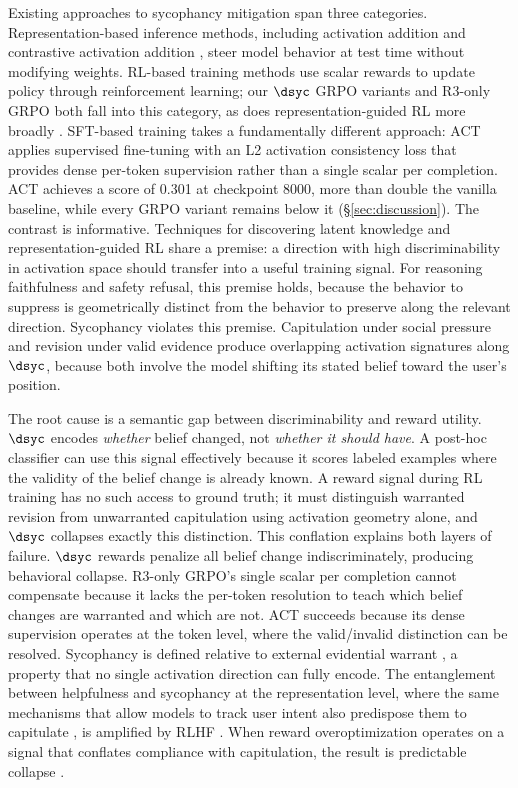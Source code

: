Existing approaches to sycophancy mitigation span three categories.
Representation-based inference methods, including activation addition \citep{turner2023actadd} and contrastive activation addition \citep{rimsky2024caa}, steer model behavior at test time without modifying weights.
RL-based training methods use scalar rewards to update policy through reinforcement learning; our $\dsyc$ GRPO variants and R3-only GRPO both fall into this category, as does representation-guided RL more broadly \citep{zhang2026latentgrpo}.
SFT-based training takes a fundamentally different approach: ACT \citep{consistency2025bctact} applies supervised fine-tuning with an L2 activation consistency loss that provides dense per-token supervision rather than a single scalar per completion.
ACT achieves a \sycon{} score of 0.301 at checkpoint 8000, more than double the vanilla baseline, while every GRPO variant remains below it (\S\ref{sec:discussion}).
The contrast is informative.
Techniques for discovering latent knowledge \citep{burns2023ccs} and representation-guided RL share a premise: a direction with high discriminability in activation space should transfer into a useful training signal.
For reasoning faithfulness and safety refusal, this premise holds, because the behavior to suppress is geometrically distinct from the behavior to preserve along the relevant direction.
Sycophancy violates this premise.
Capitulation under social pressure and revision under valid evidence produce overlapping activation signatures along $\dsyc$, because both involve the model shifting its stated belief toward the user's position.

The root cause is a semantic gap between discriminability and reward utility.
$\dsyc$ encodes \emph{whether} belief changed, not \emph{whether it should have}.
A post-hoc classifier can use this signal effectively because it scores labeled examples where the validity of the belief change is already known.
A reward signal during RL training has no such access to ground truth; it must distinguish warranted revision from unwarranted capitulation using activation geometry alone, and $\dsyc$ collapses exactly this distinction.
This conflation explains both layers of failure.
$\dsyc$ rewards penalize all belief change indiscriminately, producing behavioral collapse.
R3-only GRPO's single scalar per completion cannot compensate because it lacks the per-token resolution to teach which belief changes are warranted and which are not.
ACT succeeds because its dense supervision operates at the token level, where the valid/invalid distinction can be resolved.
Sycophancy is defined relative to external evidential warrant \citep{sharma2023sycophancy}, a property that no single activation direction can fully encode.
The entanglement between helpfulness and sycophancy at the representation level, where the same mechanisms that allow models to track user intent also predispose them to capitulate \citep{wang2025internal}, is amplified by RLHF \citep{shapira2026amplifies}.
When reward overoptimization \citep{gao2023scaling} operates on a signal that conflates compliance with capitulation, the result is predictable collapse \citep{casper2023openproblems}.

